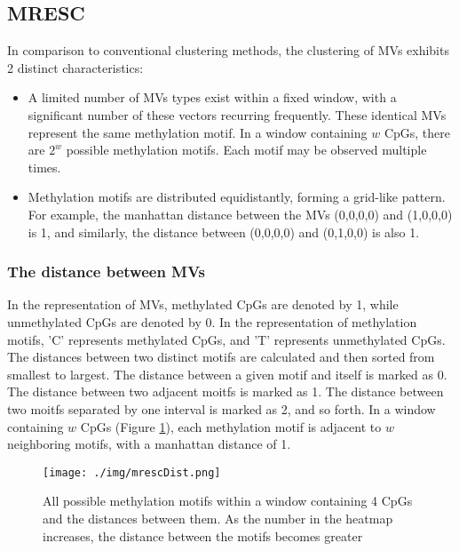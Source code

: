 \documentclass[12pt,letterpaper]{article}
\begin{document}
\subsection{MRESC}

In comparison to conventional clustering methods, the clustering of MVs exhibits 2 distinct 
characteristics:

\begin{itemize}
    \item  A limited number of MVs types exist within a fixed window, with a significant number 
    of these vectors recurring frequently. These identical MVs represent the same methylation 
    motif. In a window containing $w$ CpGs, there are $2^w$ possible methylation motifs. Each 
    motif may be observed multiple times. 
    \item  Methylation motifs are distributed equidistantly, forming a grid-like pattern. For 
    example, the manhattan distance between the MVs (0,0,0,0) and (1,0,0,0) is 1, and similarly,
    the distance between (0,0,0,0) and (0,1,0,0) is also 1.
\end{itemize}

\subsubsection{The distance between MVs}

In the representation of MVs, methylated CpGs are denoted by 1, while unmethylated CpGs are denoted 
by 0. In the representation of methylation motifs, 'C' represents methylated CpGs, and 'T' 
represents unmethylated CpGs. The distances between two distinct motifs are calculated and then 
sorted from smallest to largest. The distance between a given motif and itself is marked as 0. The 
distance between two adjacent moitfs is marked as 1. The distance between two moitfs separated by 
one interval is marked as 2, and so forth. In a window containing $w$ CpGs (Figure \ref*{fig:MRESC}), 
each methylation motif is adjacent to $w$ neighboring motifs, with a manhattan distance of 1.

\begin{figure}[ht]
    \centering
    \texttt{[image: ./img/mrescDist.png]}
    \caption{
        All possible methylation motifs within a window containing 4 CpGs and the 
        distances between them. As the number in the heatmap increases, the distance 
        between the motifs becomes greater
    }
    \label{fig:MRESC}
\end{figure}
\end{document}
